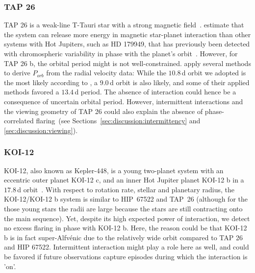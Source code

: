 \documentclass[twocolumn]{aastex631}
\begin{document}

\subsubsection{TAP 26}
\label{sec:results:individualstars:tap26}
TAP 26 is a weak-line T-Tauri star with a strong magnetic field~\citep{yu2017hot}. \citet{lanza2018closeby} estimate that the system can release more energy in magnetic star-planet interaction than other  systems with Hot Jupiters, such as HD 179949, that has previously been detected with chromospheric variability in phase with the planet's orbit~\citep{shkolnik2008nature}. However, for TAP 26 b, the orbital period might is not well-constrained. \citet{yu2017hot} apply several methods to derive $P_{orb}$ from the radial velocity data: While the $10.8\,$d orbit we adopted is the most likely according to \citet{yu2017hot}, a $9.0\,$d orbit is also likely, and some of their applied methods favored a $13.4\,$d period. The absence of interaction could hence be a consequence of uncertain orbital period. However, intermittent interactions and the viewing geometry of TAP 26 could also explain the absence of phase-correlated flaring~(see Sections~\ref{sec:discussion:intermittency} and \ref{sec:discussion:viewing}).

\subsubsection{KOI-12}
\label{sec:results:individualstars:koi12}
KOI-12, also known as Kepler-448, is a young two-planet system with an eccentric outer planet KOI-12 c, and an inner Hot Jupiter planet KOI-12 b in a $17.8\,$d orbit~\citep{masuda2017eccentric}. With respect to rotation rate, stellar and planetary radius, the KOI-12/KOI-12 b system is similar to HIP~67522 and TAP~26 (although for the those young stars the radii are large because the stars are still contracting onto the main sequence). Yet, despite its high expected power of interaction, we detect no excess flaring in phase with KOI-12 b. Here, the reason could be that KOI-12 b is in fact super-Alfv\'enic due to the relatively wide orbit compared to TAP 26 and HIP 67522. Intermittent interaction might play a role here as well, and could be favored if future observations capture episodes during which the interaction is 'on'.
\end{document}
